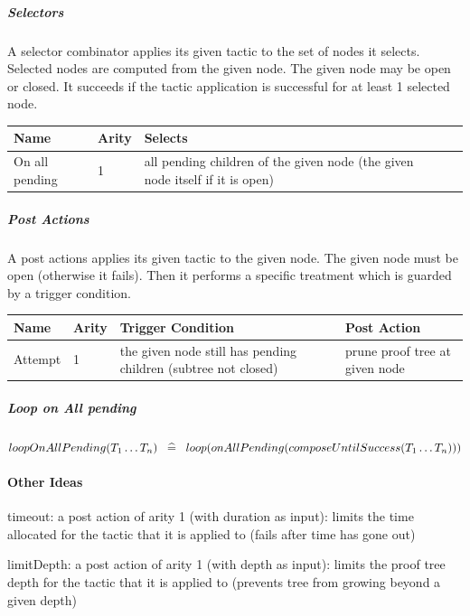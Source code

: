 \subparagraph{Selectors}

A selector combinator applies its given tactic to the set of nodes it selects. Selected nodes are computed from the given node. The given node may be open or closed. It succeeds if the tactic application is successful for at least 1 selected node. 

\begin{center}
    \begin{tabular}{ | l | l | l | p{5cm} |}
    \hline
	Name & Arity & Selects \\ \hline
	On all pending  & 1 & all pending children of the given node (the given node itself if it is open) \\ \hline
    \end{tabular}
\end{center}

\subparagraph{Post Actions}

A post actions applies its given tactic to the given node. The given node must be open (otherwise it fails). Then it performs a specific treatment which is guarded by a trigger condition. 

\begin{center}
    \begin{tabular}{ | p{} | p{1cm} | p{6cm} | p{5cm} |}
    \hline
	Name & Arity & Trigger Condition & Post Action \\ \hline
	Attempt & 1 & the given node still has pending children (subtree not closed) & prune proof tree at given node  \\ \hline
    \end{tabular}
\end{center}

\subparagraph{Loop on All pending}

$loopOnAllPending(T_1 \ldots T_n) \;\;\mathrel{\widehat=}\;\; loop(onAllPending(composeUntilSuccess(T_1 \ldots T_n)))$

\paragraph{Other Ideas}

    timeout: a post action of arity 1 (with duration as input): limits the time allocated for the tactic that it is applied to (fails after time has gone out)

    limitDepth: a post action of arity 1 (with depth as input): limits the proof tree depth for the tactic that it is applied to (prevents tree from growing beyond a given depth)
